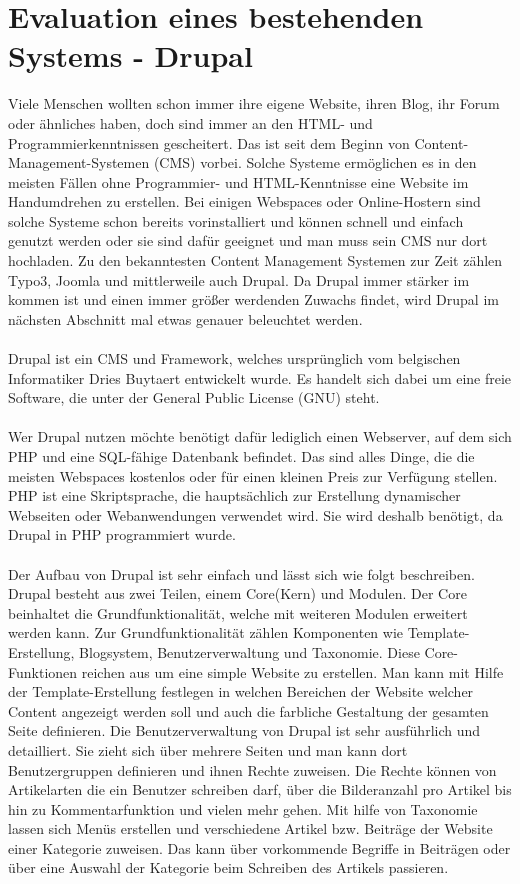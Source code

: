 \chapter{Evaluation eines bestehenden Systems - Drupal}
\label{JumpDrupal}

Viele Menschen wollten schon immer ihre eigene Website, ihren Blog, ihr Forum oder ähnliches haben, doch sind immer an den HTML- und Programmierkenntnissen gescheitert. Das ist seit dem Beginn von Content-Management-Systemen (CMS) vorbei. Solche Systeme ermöglichen es in den meisten Fällen ohne Programmier- und HTML-Kenntnisse eine Website im Handumdrehen zu erstellen. Bei einigen Webspaces oder Online-Hostern sind solche Systeme schon bereits vorinstalliert und können schnell und einfach genutzt werden oder sie sind dafür geeignet und man muss sein CMS nur dort hochladen. Zu den bekanntesten Content Management Systemen zur Zeit zählen Typo3, Joomla und mittlerweile auch Drupal. Da Drupal immer stärker im kommen ist und einen immer größer werdenden Zuwachs findet, wird Drupal im nächsten Abschnitt mal etwas genauer beleuchtet werden. \\
\\
Drupal ist ein CMS und Framework, welches ursprünglich vom belgischen Informatiker Dries Buytaert entwickelt wurde. Es handelt sich dabei um eine freie Software, die unter der General Public License (GNU) steht. \\
\\
Wer Drupal nutzen möchte benötigt dafür lediglich einen Webserver, auf dem sich PHP und eine SQL-fähige Datenbank befindet. Das sind alles Dinge, die die meisten Webspaces kostenlos oder für einen kleinen Preis zur Verfügung stellen. PHP ist eine Skriptsprache, die hauptsächlich zur Erstellung dynamischer Webseiten oder Webanwendungen verwendet wird. Sie wird deshalb benötigt, da Drupal in PHP programmiert wurde.\\
\\
Der Aufbau von Drupal ist sehr einfach und lässt sich wie folgt beschreiben. Drupal besteht aus zwei Teilen, einem Core(Kern) und Modulen. Der Core beinhaltet die Grundfunktionalität, welche mit weiteren Modulen erweitert werden kann. Zur Grundfunktionalität zählen Komponenten wie Template-Erstellung, Blogsystem, Benutzerverwaltung und Taxonomie. Diese Core-Funktionen reichen aus um eine simple Website zu erstellen. Man kann mit Hilfe der Template-Erstellung festlegen in welchen Bereichen der Website welcher Content angezeigt werden soll und auch die farbliche Gestaltung der gesamten Seite definieren. Die Benutzerverwaltung von Drupal ist sehr ausführlich und detailliert. Sie zieht sich über mehrere Seiten und man kann dort Benutzergruppen definieren und ihnen Rechte zuweisen. Die Rechte können von Artikelarten die ein Benutzer schreiben darf, über die Bilderanzahl pro Artikel bis hin zu Kommentarfunktion und vielen mehr gehen. Mit hilfe von Taxonomie lassen sich Menüs erstellen und verschiedene Artikel bzw. Beiträge der Website einer Kategorie zuweisen. Das kann über vorkommende Begriffe in Beiträgen oder über eine Auswahl der Kategorie beim Schreiben des Artikels passieren. \\
